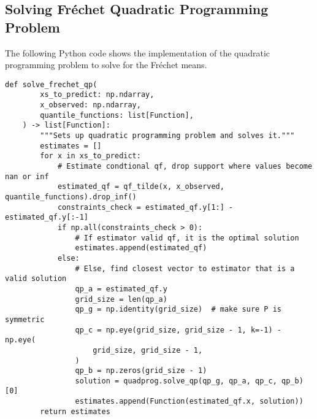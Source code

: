 \subsection{Solving Fréchet Quadratic Programming Problem}
\label{sec:code_quadratic_program}
The following Python code shows the implementation of the quadratic programming problem
to solve for the Fréchet means.

\begin{lstlisting}[style=Python]
    def solve_frechet_qp(
        xs_to_predict: np.ndarray,
        x_observed: np.ndarray,
        quantile_functions: list[Function],
    ) -> list[Function]:
        """Sets up quadratic programming problem and solves it."""
        estimates = []
        for x in xs_to_predict:
            # Estimate condtional qf, drop support where values become nan or inf
            estimated_qf = qf_tilde(x, x_observed, quantile_functions).drop_inf()
            constraints_check = estimated_qf.y[1:] - estimated_qf.y[:-1]
            if np.all(constraints_check > 0):
                # If estimator valid qf, it is the optimal solution
                estimates.append(estimated_qf)
            else:
                # Else, find closest vector to estimator that is a valid solution
                qp_a = estimated_qf.y
                grid_size = len(qp_a)
                qp_g = np.identity(grid_size)  # make sure P is symmetric
                qp_c = np.eye(grid_size, grid_size - 1, k=-1) - np.eye(
                    grid_size, grid_size - 1,
                )
                qp_b = np.zeros(grid_size - 1)
                solution = quadprog.solve_qp(qp_g, qp_a, qp_c, qp_b)[0]
                estimates.append(Function(estimated_qf.x, solution))
        return estimates
\end{lstlisting}
